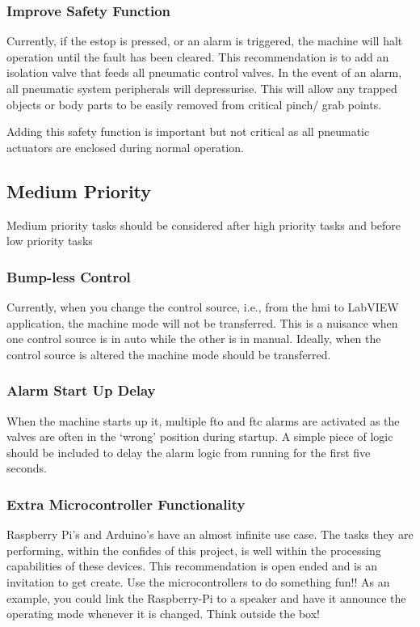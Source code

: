         \subsubsection{Improve Safety Function} 
            Currently, if the \acrshort{estop} is pressed, or an alarm is triggered, the machine will halt operation until the fault has been cleared. This recommendation is to add an isolation valve that feeds all pneumatic control valves. In the event of an alarm, all pneumatic system peripherals will depressurise. This will allow any trapped objects or body parts to be easily removed from critical pinch/ grab points. 
			
			Adding this safety function is important but not critical as all pneumatic actuators are enclosed during normal operation.
			

            

    \subsection{Medium Priority}
    
		Medium priority tasks should be considered after high priority tasks and before low priority tasks
  
        \subsubsection{Bump-less Control} 
            Currently, when you change the control source, i.e., from the \acrshort{hmi} to LabVIEW application, the machine mode will not be transferred. This is a nuisance when one control source is in auto while the other is in manual. Ideally, when the control source is altered the machine mode should be transferred. 

		\subsubsection{Alarm Start Up Delay}
			When the machine starts up it, multiple \acrshort{fto} and \acrshort{ftc} alarms are activated as the valves are often in the `wrong' position during startup. A simple piece of logic should be included to delay the alarm logic from running for the first five seconds. 
            
        \subsubsection{Extra Microcontroller Functionality} 
            Raspberry Pi's and Arduino's have an almost infinite use case. The tasks they are performing, within the confides of this project, is well within the processing capabilities of these devices. This recommendation is open ended and is an invitation to get create.  Use the microcontrollers to do something fun!! As an example, you could link the Raspberry-Pi to a speaker and have it announce the operating mode whenever it is changed. Think outside the box!
        
